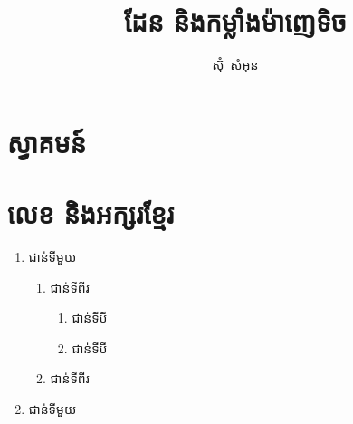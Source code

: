 \documentclass[serif]{beamer}
\title[រូបវិទ្យា]{ដែន និងកម្លាំងម៉ាញេទិច}
\author[សំអុន]{ស៊ុំ~សំអុន}
\institute[ស.ម.ក]{សាលាមេតូឌីស្ទកម្ពុជា}
\date[\khmershortdate]{\khmerdate}
\begin{document}
    \section{ស្វាគមន៍}
    \begin{frame}
        \titlepage
    \end{frame}
    \section{លេខ និងអក្សរខ្មែរ}
    \begin{frame}
        \begin{definition}
            \begin{enumerate}[m]
                \item ជាន់ទីមួយ
                \begin{enumerate}[k]
                    \item ជាន់ទីពីរ
                    \begin{enumerate}[i]
                        \item ជាន់ទីបី
                        \item ជាន់ទីបី
                    \end{enumerate}
                    \item ជាន់ទីពីរ
                \end{enumerate}
                \item ជាន់ទីមួយ
            \end{enumerate}
        \end{definition}
    \end{frame}
\end{document}
